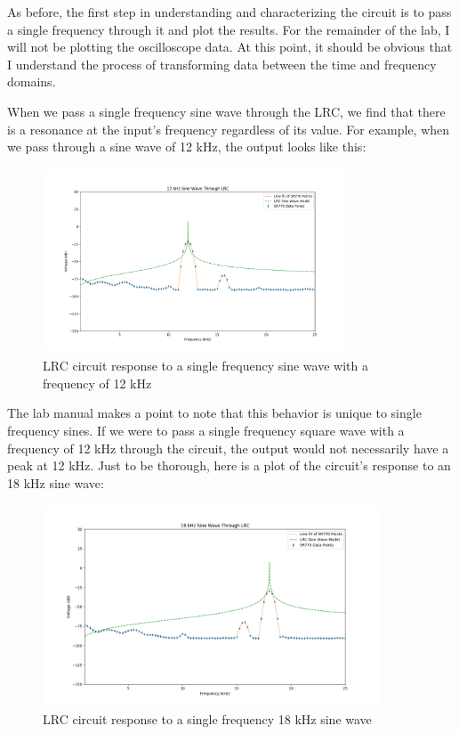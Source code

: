 \documentclass{article}
\begin{document}
As before, the first step in understanding and characterizing the circuit is to
pass a single frequency through it and plot the results. For the remainder of
the lab, I will not be plotting the oscilloscope data. At this point, it should
be obvious that I understand the process of transforming data between the time
and frequency domains. 

When we pass a single frequency sine wave through the LRC, we find that there
is a resonance at the input's frequency regardless of its value. For example,
when we pass through a sine wave of 12 kHz, the output looks like this:

\begin{figure}[H]
    \centering
\begin{minipage}{11cm}
\begin{tcolorbox}
    \centering
        \includegraphics[width=9cm, height=5.5cm]{figures/figure20.png}
        \caption{LRC circuit response to a single frequency sine wave with a
        frequency of 12 kHz}
        \label{fig:fig20}
\end{tcolorbox}
\end{minipage}
\end{figure}

The lab manual makes a point to note that this behavior is unique to single
frequency sines. If we were to pass a single frequency square wave with a
frequency of 12 kHz through the circuit, the output would not necessarily have
a peak at 12 kHz. Just to be thorough, here is a plot of the circuit's response
to an 18 kHz sine wave:

\begin{figure}[H]
    \centering
\begin{minipage}{11cm}
\begin{tcolorbox}
    \centering
        \includegraphics[width=10cm, height=6cm]{figures/figure21.png}
        \caption{LRC circuit response to a single frequency 18 kHz sine wave}
        \label{fig:fig21}
\end{tcolorbox}
\end{minipage}
\end{figure}
\end{document}
